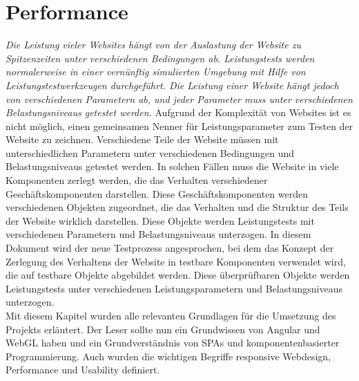 \section{Performance}
\label{sec:performance}
%
\textit{Die Leistung vieler Websites hängt von der Auslastung der Website zu Spitzenzeiten unter verschiedenen Bedingungen ab. Leistungstests werden normalerweise in einer vernünftig simulierten Umgebung mit Hilfe von Leistungstestwerkzeugen durchgeführt. Die Leistung einer Website hängt jedoch von verschiedenen Parametern ab, und jeder Parameter muss unter verschiedenen Belastungsniveaus getestet werden.} Aufgrund der Komplexität von Websites ist es nicht möglich, einen gemeinsamen Nenner für Leistungsparameter zum Testen der Website zu zeichnen. Verschiedene Teile der Website müssen mit unterschiedlichen Parametern unter verschiedenen Bedingungen und Belastungsniveaus getestet werden. In solchen Fällen muss die Website in viele Komponenten zerlegt werden, die das Verhalten verschiedener Geschäftskomponenten darstellen. Diese Geschäftskomponenten werden verschiedenen Objekten zugeordnet, die das Verhalten und die Struktur des Teils der Website wirklich darstellen. Diese Objekte werden Leistungstests mit verschiedenen Parametern und Belastungsniveaus unterzogen. In diesem Dokument wird der neue Testprozess angesprochen, bei dem das Konzept der Zerlegung des Verhaltens der Website in testbare Komponenten verwendet wird, die auf testbare Objekte abgebildet werden. Diese überprüfbaren Objekte werden Leistungstests unter verschiedenen Leistungsparametern und Belastungsniveaus unterzogen.\\

Mit diesem Kapitel wurden alle relevanten Grundlagen für die Umsetzung des Projekts erläutert. Der Leser sollte nun ein Grundwissen von Angular und WebGL haben und ein Grundverständnis von SPAs und komponentenbasierter Programmierung. Auch wurden die wichtigen Begriffe responsive Webdesign, Performance und Usability definiert.